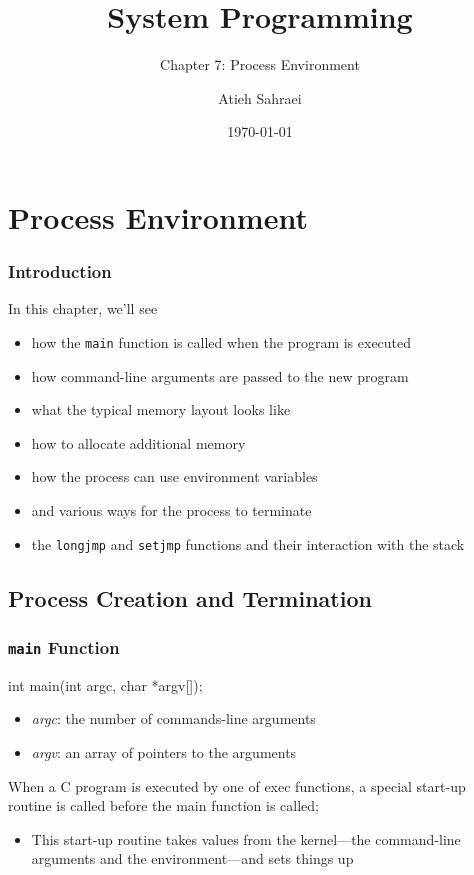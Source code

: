 \documentclass[newPxFont,sthlmFooter,nooffset]{beamer}
\title{System Programming}
\subtitle{Chapter 7: Process Environment}
\author{Atieh Sahraei}
\institute{Systems Research Lab.\\Gyeongsang National University}
\date{\today}
\begin{document}
\frame[plain]{\titlepage}







\section{Process Environment}

\begin{frame}[t]
  \frametitle{Introduction}
In this chapter, we'll see
\begin{itemize}
\item how the \texttt{main} function is called when the program is executed
\item how command-line arguments are passed to the new program
\item what the typical memory layout looks like
\item how to allocate additional memory
\item how the process can use environment variables
\item and various ways for the process to terminate
\item the \texttt{longjmp} and \texttt{setjmp} functions and their interaction with the stack
\end{itemize}

\end{frame}



\subsection{Process Creation and Termination }

\begin{frame}[containsverbatim,t]
  \frametitle{\texttt{main} Function}
\begin{codedef}
int main(int argc, char *argv[]);
\end{codedef}
\begin{itemize}
\item \textit{argc}: the number of commands-line arguments
\item \textit{argv}: an array of pointers to the arguments
\end{itemize}

When a C program is executed by one of exec functions, a special start-up routine is called before the main function is called;
\begin{itemize}
\item This start-up routine takes values from the kernel---the
  command-line arguments and the environment---and sets things up
\end{itemize}

\end{frame}
\end{document}
